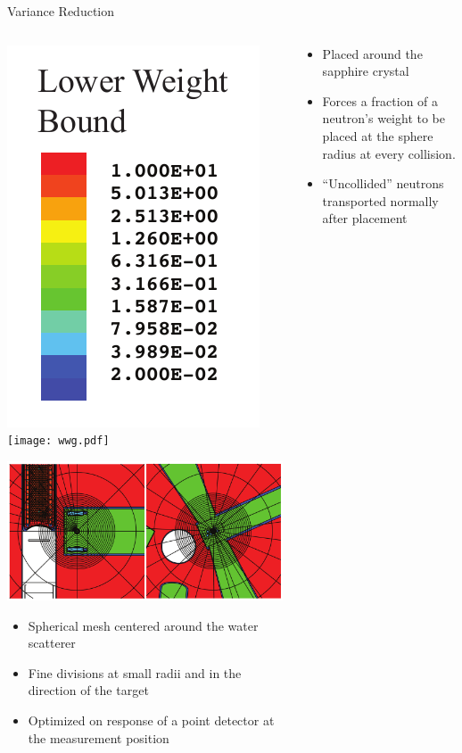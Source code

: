 \documentclass[final,t]{beamer}
\begin{document}
\begin{frame}{}
\begin{columns}[t]
\begin{column}{.3\linewidth}
\begin{block}{Variance Reduction}
      \begin{columns}

      \begin{column}{0.5\linewidth}

      \begin{center}
      \includegraphics*[width=.15\linewidth]{wwg_key.pdf} \texttt{[image: wwg.pdf]}

      \includegraphics*[width=\linewidth]{wwg_mesh.pdf}
      \end{center}

      \begin{itemize}
      \item Spherical mesh centered around the water scatterer 
      \item Fine divisions at small radii and in the direction of the target 
      \item Optimized on response of a point detector at the measurement position
      \end{itemize}

      \end{column}


      \begin{column}{0.5\linewidth}

      \begin{itemize}
      \item Placed around the sapphire crystal 
      \item Forces a fraction of a neutron's weight to be placed at the sphere radius at every collision.
      \item ``Uncollided'' neutrons transported normally after placement \cite{mcnpx270}
      \end{itemize}


\end{column}
\end{columns}
\end{block}
\end{column}
\end{columns}
\end{frame}
\end{document}
